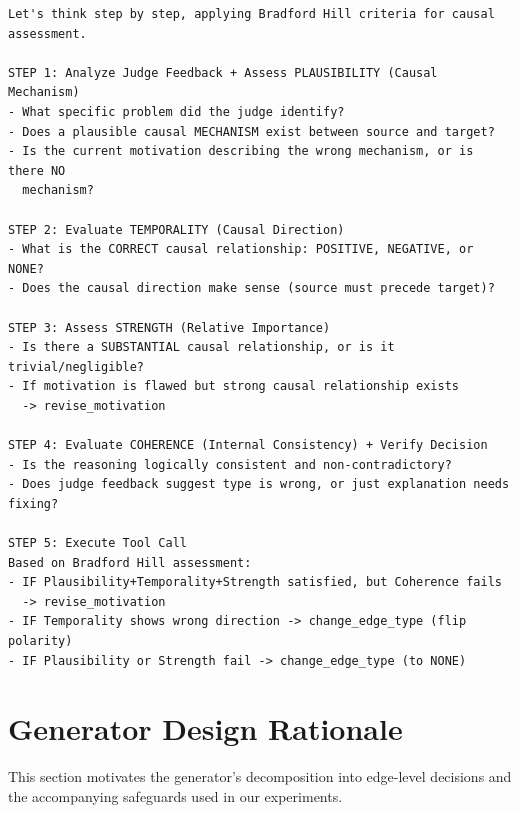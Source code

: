 \begin{small}
\begin{verbatim}
Let's think step by step, applying Bradford Hill criteria for causal assessment.

STEP 1: Analyze Judge Feedback + Assess PLAUSIBILITY (Causal Mechanism)
- What specific problem did the judge identify?
- Does a plausible causal MECHANISM exist between source and target?
- Is the current motivation describing the wrong mechanism, or is there NO
  mechanism?

STEP 2: Evaluate TEMPORALITY (Causal Direction)
- What is the CORRECT causal relationship: POSITIVE, NEGATIVE, or NONE?
- Does the causal direction make sense (source must precede target)?

STEP 3: Assess STRENGTH (Relative Importance)
- Is there a SUBSTANTIAL causal relationship, or is it trivial/negligible?
- If motivation is flawed but strong causal relationship exists
  -> revise_motivation

STEP 4: Evaluate COHERENCE (Internal Consistency) + Verify Decision
- Is the reasoning logically consistent and non-contradictory?
- Does judge feedback suggest type is wrong, or just explanation needs fixing?

STEP 5: Execute Tool Call
Based on Bradford Hill assessment:
- IF Plausibility+Temporality+Strength satisfied, but Coherence fails
  -> revise_motivation
- IF Temporality shows wrong direction -> change_edge_type (flip polarity)
- IF Plausibility or Strength fail -> change_edge_type (to NONE)
\end{verbatim}
\end{small}

\section{Generator Design Rationale}
\label{app:generator_design_rationale}

This section motivates the generator's decomposition into edge-level decisions and the accompanying safeguards used in our experiments.


